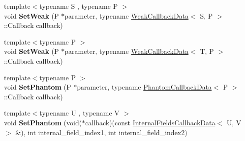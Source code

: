 \begin{DoxyCompactItemize}
\item 
\hypertarget{classv8_1_1_persistent_base_a26cacb456e6a02bb8214dfd8a31247c9}{}{\footnotesize template$<$typename S , typename P $>$ }\\void {\bfseries Set\+Weak} (P $\ast$parameter, typename \hyperlink{classv8_1_1_weak_callback_data}{Weak\+Callback\+Data}$<$ S, P $>$\+::Callback callback)\label{classv8_1_1_persistent_base_a26cacb456e6a02bb8214dfd8a31247c9}

\item 
\hypertarget{classv8_1_1_persistent_base_aaf342ece1a4ba926ba62e8d6af7be777}{}{\footnotesize template$<$typename P $>$ }\\void {\bfseries Set\+Weak} (P $\ast$parameter, typename \hyperlink{classv8_1_1_weak_callback_data}{Weak\+Callback\+Data}$<$ T, P $>$\+::Callback callback)\label{classv8_1_1_persistent_base_aaf342ece1a4ba926ba62e8d6af7be777}

\item 
\hypertarget{classv8_1_1_persistent_base_ae17ba38cbd838f4e98e349be8bfc75dc}{}{\footnotesize template$<$typename P $>$ }\\void {\bfseries Set\+Phantom} (P $\ast$parameter, typename \hyperlink{classv8_1_1_phantom_callback_data}{Phantom\+Callback\+Data}$<$ P $>$\+::Callback callback)\label{classv8_1_1_persistent_base_ae17ba38cbd838f4e98e349be8bfc75dc}

\item 
\hypertarget{classv8_1_1_persistent_base_a70685c161fc31cd3c58e0d892cd529bc}{}{\footnotesize template$<$typename U , typename V $>$ }\\void {\bfseries Set\+Phantom} (void($\ast$callback)(const \hyperlink{classv8_1_1_internal_fields_callback_data}{Internal\+Fields\+Callback\+Data}$<$ U, V $>$ \&), int internal\+\_\+field\+\_\+index1, int internal\+\_\+field\+\_\+index2)\label{classv8_1_1_persistent_base_a70685c161fc31cd3c58e0d892cd529bc}

\end{DoxyCompactItemize}
